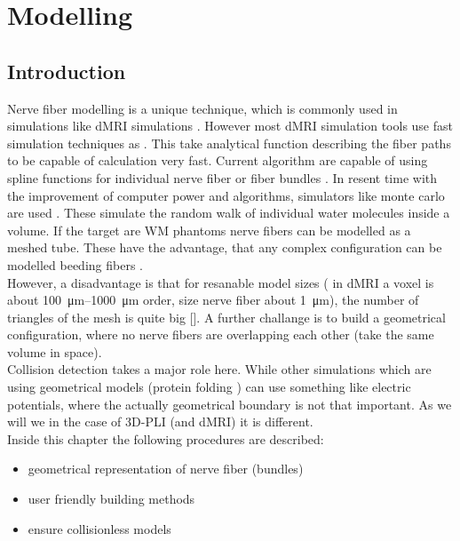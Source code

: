 \setcounter{chapter}{4}
\chapter{Modelling}
\label{chap:modelling}
% 
% 
\section{Introduction}
% 
Nerve fiber modelling is a unique technique, which is commonly used in simulations like \ac{dMRI} simulations \dummy.
However most \ac{dMRI} simulation tools use fast simulation techniques as \dummy.
This take analytical function describing the fiber paths to be capable of calculation very fast.
% 
Current algorithm are capable of using spline functions for individual nerve fiber or fiber bundles \cite{Balls2009}.
% 
In resent time with the improvement of computer power and algorithms, simulators like monte carlo are used \dummy.
These simulate the random walk of individual water molecules inside a volume.
If the target are \ac{WM} phantoms nerve fibers can be modelled as a meshed tube.
These have the advantage, that any complex configuration can be modelled \eg beeding fibers \dummy.
\\
%
However, a disadvantage is that for resanable model sizes ( in \ac{dMRI} a voxel is about \SIrange{100}{1000}{\micro\meter} order, size nerve fiber about \SI{1}{\micro\meter}), the number of triangles of the mesh is quite big [\dummy].
A further challange is to build a geometrical configuration, where no nerve fibers are overlapping each other (\ie  take the same volume in space).
\\
% 
Collision detection takes a major role here.
While other simulations which are using geometrical models (\eg protein folding \dummy) can use something like electric potentials, where the actually geometrical boundary is not that important.
As we will we in the case of \ac{3D-PLI} (and \ac{dMRI}) it is different.
\\
% 
Inside this chapter the following procedures are described:
\begin{itemize}[nosep]
    \item geometrical representation of nerve fiber (bundles)
    \item user friendly building methods
    \item ensure collisionless models
\end{itemize}
% 

